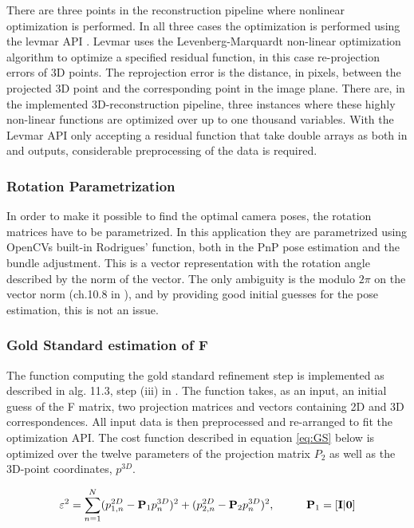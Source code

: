 There are three points in the reconstruction pipeline where nonlinear optimization is performed. In all three cases the optimization is performed using the levmar API \cite{levmar}. Levmar uses the Levenberg-Marquardt non-linear optimization algorithm to optimize a specified residual function, in this case re-projection errors of 3D points. The reprojection error is the distance, in pixels, between the projected 3D point and the corresponding point in the image plane. There are, in the implemented 3D-reconstruction pipeline, three instances where these highly non-linear functions are optimized over up to one thousand variables. With the Levmar API only accepting a residual function that take double arrays as both in and outputs, considerable preprocessing of the data is required.

\subsubsection{Rotation Parametrization}
In order to make it possible to find the optimal camera poses, the rotation matrices have to be parametrized. In this application they are parametrized using OpenCVs built-in Rodrigues' function, both in the PnP pose estimation and the bundle adjustment. This is a vector representation with the rotation angle described by the norm of the vector. The only ambiguity is the modulo $2\pi$ on the vector norm (ch.10.8 in \cite{Klas}), and by providing good initial guesses for the pose estimation, this is not an issue.

\subsubsection{Gold Standard estimation of F}
The function computing the gold standard refinement step is implemented as described in alg. 11.3, step (iii) in \cite{HZ}. The function takes, as an input, an initial guess of the F matrix, two projection matrices and vectors containing 2D and 3D correspondences. All input data is then preprocessed and re-arranged to fit the optimization API. The cost function described in equation \eqref{eq:GS} below is optimized over the twelve parameters of the projection matrix $P_2$ as well as the 3D-point coordinates, $p^{3D}$. 

\begin{equation}
\label{eq:GS}
\varepsilon^2 = \sum_{n=1}^{N} (p_{1,n}^{2D} - \textbf{P}_1p_{n}^{3D})^2 + (p_{2,n}^{2D} - \textbf{P}_2p_{n}^{3D})^2, \hspace{1cm} \textbf{P}_1 = [\bf{I} | \bf{0}]
\end{equation} 

